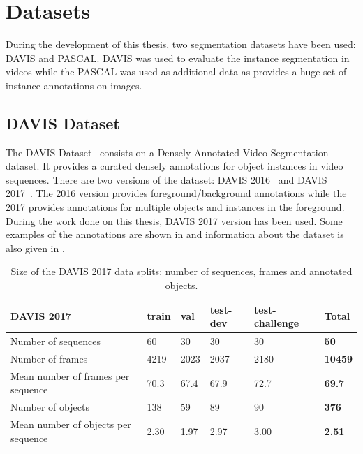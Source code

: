 \section{Datasets}

During the development of this thesis, two segmentation datasets have been used: DAVIS and PASCAL.
DAVIS was used to evaluate the instance segmentation in videos while the PASCAL was used as additional data as provides a huge set of instance annotations on images.

\subsection{DAVIS Dataset}

The DAVIS Dataset~\cite{Perazzi2016,PontTuset2017} consists on a Densely Annotated Video Segmentation dataset.
It provides a curated densely annotations for object instances in video sequences.
There are two versions of the dataset: DAVIS 2016~\cite{Perazzi2016} and DAVIS 2017~\cite{PontTuset2017}.
The 2016 version provides foreground/background annotations while the 2017 provides annotations for multiple objects and instances in the foreground.
During the work done on this thesis, DAVIS 2017 version has been used.
Some examples of the annotations are shown in  and information about the dataset is also given in .

\begin{table}[h]
  \centering
  \begin{tabular}{l|lllll}
    DAVIS 2017                          & train & val  & test-dev & test-challenge & \textbf{Total} \\
    \hline
    Number of sequences                 & 60    & 30   & 30       & 30             & \textbf{50}    \\
    Number of frames                    & 4219  & 2023 & 2037     & 2180           & \textbf{10459} \\
    Mean number of frames per sequence  & 70.3  & 67.4 & 67.9     & 72.7           & \textbf{69.7}  \\
    Number of objects                   & 138   & 59   & 89       & 90             & \textbf{376}   \\
    Mean number of objects per sequence & 2.30  & 1.97 & 2.97     & 3.00           & \textbf{2.51}
  \end{tabular}
  \caption{Size of the DAVIS 2017 data splits: number of sequences, frames and annotated objects.}
  \label{tab:davis}
\end{table}

